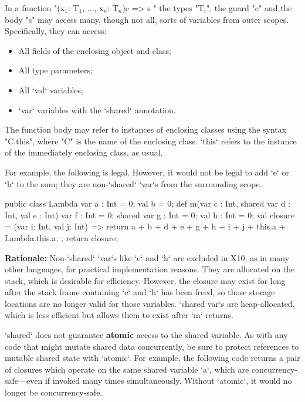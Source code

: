 In a function
\xcdmath"(x$_1$: T$_1$, $\dots$, x$_n$: T$_n$){c} => { s }"
the types \xcdmath"T$_i$", the guard \xcd"c" and the body \xcd"s"
may access many, though not all, sorts of variables from outer scopes.  
Specifically, they can access: 
\begin{itemize}
\item All fields of the enclosing object and class;
\item All type parameters;
\item All \xcd`val` variables;
\item \xcd`var` variables with the \xcd`shared` annotation. 
\end{itemize}



The function body may refer to instances of enclosing classes using
the syntax \xcd"C.this", where \xcd"C" is the name of the
enclosing class.  \xcd`this` refers to the instance of the immediately
enclosing class, as usual.

For example, the following is legal.  However, it would not be legal to add
\xcd`e` or \xcd`h` to the sum; they are non-\xcd`shared` \xcd`var`s from the
surrounding scope.
\begin{xten}
public class Lambda {
   var a : Int = 0;
   val b = 0;
   def m(var c : Int, shared var d : Int,  val e : Int) {
      var f : Int = 0;
      shared var g : Int = 0;
      val h : Int = 0;
      val closure = (var i: Int, val j: Int) => {
    	  return a + b + d + e + g + h + i + j + this.a + Lambda.this.a;
      };
      return closure;
   }
}
\end{xten}

{\bf Rationale:} Non-\xcd`shared` \xcd`var`s like \xcd`e` and \xcd`h` are
excluded in X10, as in many other languages, for practical implementation
reasons. They are allocated on the stack, which is desirable for efficiency.
However, the closure may exist for long after the stack frame containing
\xcd`e` and \xcd`h` has been freed, so those storage locations are no longer
valid for those variables. \xcd`shared var`s are heap-allocated, which is less
efficient but allows them to exist after \xcd`m` returns. 

\begin{note}
\xcd`shared` does not guarantee {\bf atomic} access to the shared variable. As
with any code that might mutate shared data concurrently, be sure to protect
references to mutable shared state with \xcd`atomic`. For example, the
following code returns a pair of closures which operate on the same shared
variable \xcd`a`, which are concurrency-safe---even if invoked many times
simultaneously. Without \xcd`atomic`, it would no longer be concurrency-safe.
\end{note}

